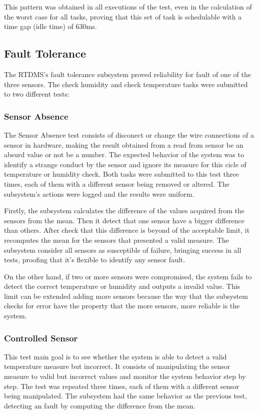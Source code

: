 \documentclass[12pt]{article}
\begin{document}
This pattern was obtained in all executions of the test, even in the calculation of the worst case for all tasks, proving
that this set of task is schedulable with a time gap (idle time) of 630ms.

\subsection{Fault Tolerance}
The RTDMS's fault tolerance subsystem proved reliability for fault of one of the three sensors. The check humidity and check
temperature tasks were submitted to two different tests:

\subsubsection{Sensor Absence}
The Sensor Absence test consists of disconect or change the wire connections of a sensor in hardware, making the result
obtained from a read from sensor be an absurd value or not be a number. The expected behavior of the system was to identify
a strange conduct by the sensor and ignore its measure for this cicle of temperature or humidity check. Both tasks were 
submitted to this test three times, each of them with a different sensor being removed or altered. The subsystem's actions 
were logged and the results were uniform.

Firstly, the subsystem calculates the difference of the values acquired from the sensors from the mean. Then it detect
that one sensor have a bigger difference than others. After check that this difference is beyond of the acceptable limit,
it recomputes the mean for the sensors that presented a valid measure. The subsystem consider all sensors as susceptible 
of failure, bringing success in all tests, proofing that it's flexible to identify any sensor fault.

On the other hand, if two or more sensors were compromised, the system fails to detect the correct temperature or humidity 
and outputs a invalid value. This limit can be extended adding more sensors because the way that the subsystem checks for 
error have the property that the more sensors, more reliable is the system.

\subsubsection{Controlled Sensor}
This test main goal is to see whether the system is able to detect a valid temperature measure but incorrect. It consists of
manipulating the sensor measure to valid but incorrect values and monitor the system behavior step by step. The test was 
repeated three times, each of them with a different sensor being manipulated. The subsystem had the same behavior as the
previous test, detecting an fault by computing the difference from the mean.
\end{document}
